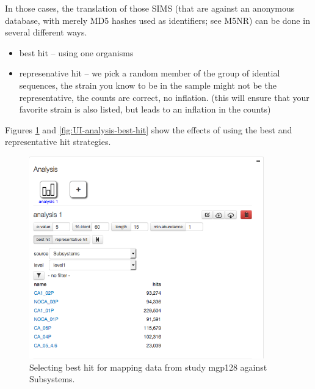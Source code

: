 \documentclass[12pt,fullpage]{report}
\begin{document}
In those cases, the translation of those SIMS (that are against an anonymous database, with merely MD5 hashes used as identifiers; see M5NR) can be done in several different ways.

\begin{itemize}
\item best hit -- using one organisms
\item represenative hit -- we pick a random member of the group of idential sequences, the strain you know to be in the sample might not be the representative, the counts are correct, no inflation.
(this will ensure that your favorite strain is also listed, but leads to an inflation in the counts)
\end{itemize}

Figures \ref{fig:UI-analysis-representative-hit} and \ref{fig:UI-analysis-best-hit} show the effects of using the best and representative hit strategies.

\begin{figure}
\begin{center}
\includegraphics[width=4in]{Images/v402-UI-Analysis-best-hit-selected.png}
\end{center}
\caption{
Selecting best hit for mapping data from study mgp128 against Subsystems.
}
\label{fig:UI-analysis-representative-hit}
\end{figure}
\end{document}
